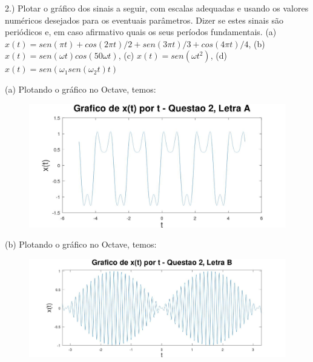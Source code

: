 \documentclass{article}
\begin{document}
2.) Plotar o gráfico dos sinais a seguir, com escalas adequadas e usando os valores numéricos desejados para os eventuais parâmetros. Dizer se estes sinais são periódicos e, em caso afirmativo quais os seus períodos fundamentais.
(a) $x(t) = sen(\pi t) + cos(2 \pi t) / 2 + sen(3 \pi t) / 3 + cos(4 \pi t) / 4$,
(b) $x(t) = sen(\omega t)cos(50\omega t)$,
(c) $x(t) = sen(\omega t^2)$,
(d) $x(t) = sen(\omega_{1}sen(\omega_{2}t)t)$

\vspace{\baselineskip}

(a) Plotando o gráfico no Octave, temos:

\vspace{\baselineskip}

\begin{figure}[h!]
    \includegraphics[scale=0.3]{plot2a}
    \centering
\end{figure}

\newpage

(b) Plotando o gráfico no Octave, temos:

\vspace{\baselineskip}

\begin{figure}[h!]
    \includegraphics[scale=0.25]{plot2b}
    \centering
\end{figure}

\vspace{\baselineskip}
\end{document}
